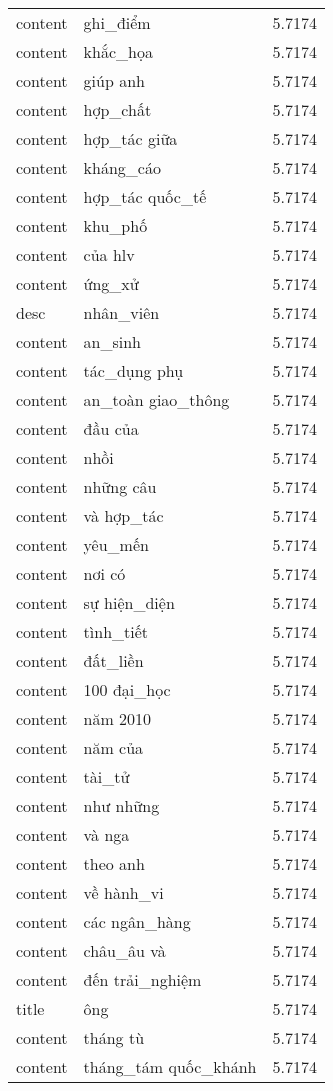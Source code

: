 \documentclass{article}
\begin{document}
\begin{tabular}{lll}
content & ghi\_điểm & 5.7174\\
content & khắc\_họa & 5.7174\\
content & giúp anh & 5.7174\\
content & hợp\_chất & 5.7174\\
content & hợp\_tác giữa & 5.7174\\
content & kháng\_cáo & 5.7174\\
content & hợp\_tác quốc\_tế & 5.7174\\
content & khu\_phố & 5.7174\\
content & của hlv & 5.7174\\
content & ứng\_xử & 5.7174\\
desc & nhân\_viên & 5.7174\\
content & an\_sinh & 5.7174\\
content & tác\_dụng phụ & 5.7174\\
content & an\_toàn giao\_thông & 5.7174\\
content & đầu của & 5.7174\\
content & nhồi & 5.7174\\
content & những câu & 5.7174\\
content & và hợp\_tác & 5.7174\\
content & yêu\_mến & 5.7174\\
content & nơi có & 5.7174\\
content & sự hiện\_diện & 5.7174\\
content & tình\_tiết & 5.7174\\
content & đất\_liền & 5.7174\\
content & 100 đại\_học & 5.7174\\
content & năm 2010 & 5.7174\\
content & năm của & 5.7174\\
content & tài\_tử & 5.7174\\
content & như những & 5.7174\\
content & và nga & 5.7174\\
content & theo anh & 5.7174\\
content & về hành\_vi & 5.7174\\
content & các ngân\_hàng & 5.7174\\
content & châu\_âu và & 5.7174\\
content & đến trải\_nghiệm & 5.7174\\
title & ông & 5.7174\\
content & tháng tù & 5.7174\\
content & tháng\_tám quốc\_khánh & 5.7174\\

\end{tabular}
\end{document}
